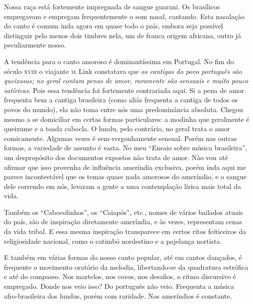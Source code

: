 Nossa raça está fortemente impregnada de sangue guarani. Os brasílicos
empregavam e empregam frequentemente o som nasal, cantando. Esta
nasalação do canto é comum inda agora em quase todo o país, embora seja
possível distinguir pelo menos dois timbres nela, um de franca origem
africana, outro já peculiarmente nosso.

A tendência para o canto amoroso é dominantíssima em Portugal. No fim do
século \textsc{xviii} o viajante \textsc{m}.\,Link constatava que \textit{as cantigas do povo
português são queixosas; no geral contam penas de amor, raramente são
sensuais e muito pouco satíricas}. Pois essa tendência foi fortemente
contrariada aqui. Si a pena de amor frequenta bem a cantiga brasileira
(como aliás frequenta a cantiga de todos os povos do mundo), ela não
toma entre nós uma predominância absoluta. Chegou mesmo a se domiciliar
em certas formas particulares: a modinha que geralmente é queixume e a
toada cabocla. O lundu, pelo contrário, no geral trata o amor
comicamente. Algumas vezes é sem-vergonhamente sensual. Porém nas outras
formas, a variedade de assunto é vasta. No meu ``Ensaio sobre música
brasileira'', um despropósito dos documentos expostos não trata de amor.
Não vou até afirmar que isso provenha de influência ameríndia exclusiva,
porém inda aqui me parece incontestável que os temas quase nada amorosos
do ameríndio, e o sangue dele correndo em nós, levaram a gente a uma
contemplação lírica mais total da vida.

Também os ``Cabocolinhos'', os ``Caiapós'', etc., nomes de vários
bailados atuais do país, são de inspiração diretamente ameríndia, e às
vezes, representam cenas da vida tribal. E essa mesma inspiração
transparece em certos ritos feiticeiros da religiosidade nacional, como
o catimbó nordestino e a pajelança nortista.

E também em várias formas do nosso canto popular, até em cantos
dançados, é frequente o movimento oratório da melodia, libertando-se da
quadratura estrófica e até do compasso. Nos martelos, nos cocos, nos
desafios, o ritmo discursivo é empregado. Donde nos veio isso? Do
português não veio. Frequenta a música afro-brasileira dos lundus, porém
com raridade. Nos ameríndios é constante.

